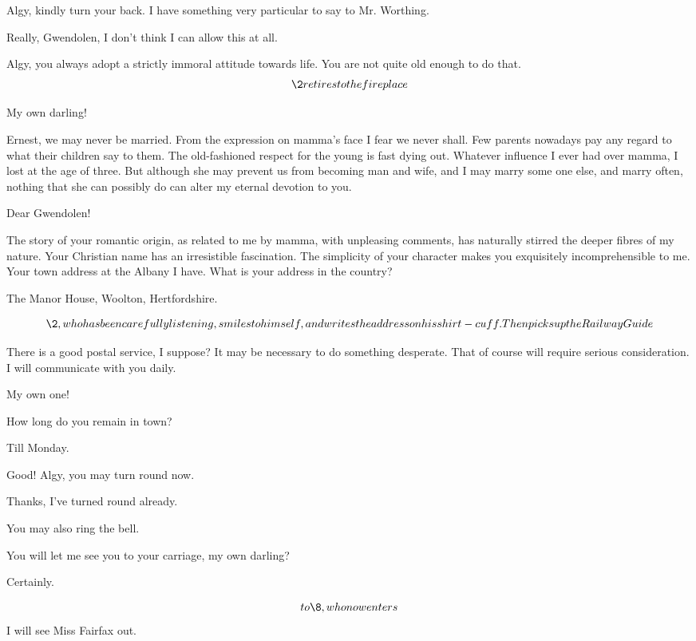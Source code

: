 \documentclass{book}
\begin{document}
\4 Algy, kindly turn your back.  I have something very
particular to say to Mr. Worthing.

\2  Really, Gwendolen, I don't think I can allow this at
all.

\4  Algy, you always adopt a strictly immoral attitude
towards life.  You are not quite old enough to do that.  \[\2
retires to the fireplace\]

\1  My own darling!

\4  Ernest, we may never be married.  From the expression
on mamma's face I fear we never shall.  Few parents nowadays pay
any regard to what their children say to them.  The old-fashioned
respect for the young is fast dying out.  Whatever influence I ever
had over mamma, I lost at the age of three.  But although she may
prevent us from becoming man and wife, and I may marry some one
else, and marry often, nothing that she can possibly do can alter
my eternal devotion to you.

\1  Dear Gwendolen!

\4  The story of your romantic origin, as related to me by
mamma, with unpleasing comments, has naturally stirred the deeper
fibres of my nature.  Your Christian name has an irresistible
fascination.  The simplicity of your character makes you
exquisitely incomprehensible to me.  Your town address at the
Albany I have.  What is your address in the country?

\1  The Manor House, Woolton, Hertfordshire.

\[\2, who has been carefully listening, smiles to himself, and
writes the address on his shirt-cuff.  Then picks up the Railway
Guide\]

\4  There is a good postal service, I suppose?  It may be
necessary to do something desperate.  That of course will require
serious consideration.  I will communicate with you daily.

\1  My own one!

\4  How long do you remain in town?

\1  Till Monday.

\4  Good!  Algy, you may turn round now.

\2  Thanks, I've turned round already.

\4  You may also ring the bell.

\1  You will let me see you to your carriage, my own darling?

\4  Certainly.

\1  \[to \8, who now enters\]  I will see Miss Fairfax out.
\end{document}
